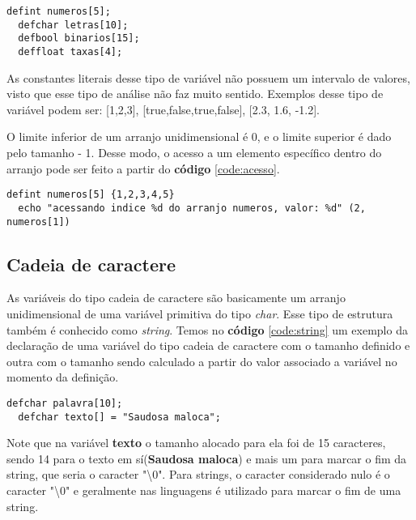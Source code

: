 \documentclass[
  12pt,				%
  oneside,			%
  a4paper,			%
  english,			%
  french,				%
  spanish,			%
  brazil,				%
]{abntex2}
\begin{document}
\begin{lstlisting}[label=code:arranjos-unidimensionais,caption=Declaração
    de uma variável do tipo arranjo unidimensional.]
  defint numeros[5];
  defchar letras[10];
  defbool binarios[15];
  deffloat taxas[4];
\end{lstlisting}

As constantes literais desse tipo de variável não possuem um intervalo
de valores, visto que esse tipo de análise não faz muito
sentido. Exemplos desse tipo de variável podem ser: [1,2,3],
[true,false,true,false], [2.3, 1.6, -1.2].

O limite inferior de um arranjo unidimensional é 0, e o limite
superior é dado pelo tamanho - 1. Desse modo, o acesso a um elemento
específico dentro do arranjo pode ser feito a partir do
\textbf{código} \ref{code:acesso}.

\begin{lstlisting}[label=code:acesso,caption=Acessando elemento dentro
    de um arranjo unidimensional]
  defint numeros[5] {1,2,3,4,5}
  echo "acessando indice %d do arranjo numeros, valor: %d" (2, numeros[1]) 
\end{lstlisting}


\subsection{Cadeia de caractere}
\label{subsec:cadeia-de-caractere}

As variáveis do tipo cadeia de caractere são basicamente um arranjo
unidimensional de uma variável primitiva do tipo \emph{char}. Esse
tipo de estrutura também é conhecido como \emph{string}. Temos no
\textbf{código} \ref{code:string} um exemplo da declaração de uma
variável do tipo cadeia de caractere com o tamanho definido e outra
com o tamanho sendo calculado a partir do valor associado a variável
no momento da definição.

\begin{lstlisting}[label=code:string,caption=Declaração de variáveis
    do tipo cadeia de caractere.]
  defchar palavra[10];
  defchar texto[] = "Saudosa maloca";
\end{lstlisting}

Note que na variável \textbf{texto} o tamanho alocado para ela foi de
15 caracteres, sendo 14 para o texto em sí(\textbf{Saudosa maloca}) e
mais um para marcar o fim da string, que seria o caracter "\textbackslash0". Para
strings, o caracter considerado nulo é o caracter "\textbackslash0" e geralmente
nas linguagens é utilizado para marcar o fim de uma string.
\end{document}
